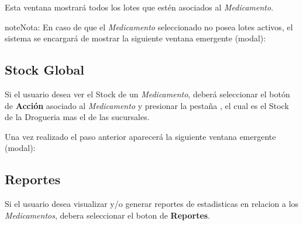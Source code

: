 \documentclass[a4paper,10pt,spanish]{sphinxmanual}
\begin{document}
Esta ventana mostrará todos los lotes que estén asociados al \emph{Medicamento}.

\begin{notice}{note}{Nota:}
En caso de que el \emph{Medicamento} seleccionado no posea lotes activos, el sistema se encargará de mostrar la siguiente ventana emergente (modal):

\end{notice}


\subsection{Stock Global}
\label{medicams:stock-global}\label{medicams:id5}
Si el usuario desea ver el Stock de un \emph{Medicamento}, deberá seleccionar el botón de \textbf{Acción} asociado al \emph{Medicamento} y presionar la pestaña , el cual es el Stock de la Drogueria mas el de las sucursales.


Una vez realizado el paso anterior aparecerá la siguiente ventana emergente (modal):



\subsection{Reportes}
\label{medicams:reportes}\label{medicams:reportes-pc}
Si el usuario desea visualizar y/o generar reportes de estadisticas en relacion a los \emph{Medicamentos}, debera seleccionar el boton de \textbf{Reportes}.

\end{document}
